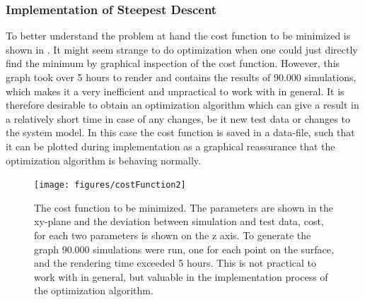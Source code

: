 \subsubsection{Implementation of Steepest Descent}
To better understand the problem at hand the cost function to be minimized is shown in . It might seem strange to do optimization when one could just directly find the minimum by graphical inspection of the cost function. However, this graph took over 5 hours to render and contains the results of 90.000 simulations, which makes it a very inefficient and unpractical to work with in general. It is therefore desirable to obtain an optimization algorithm which can give a result in a relatively short time in case of any changes, be it new test data or changes to the system model. In this case the cost function is saved in a data-file, such that it can be plotted during implementation as a graphical reassurance that the optimization algorithm is behaving normally.

\begin{figure}[H]
	\centering
	\texttt{[image: figures/costFunction2]}
	\caption{The cost function to be minimized. The parameters are shown in the xy-plane and the deviation between simulation and test data, cost, for each two parameters is shown on the z axis. To generate the graph 90.000 simulations were run, one for each point on the surface, and the rendering time exceeded 5 hours. This is not practical to work with in general, but valuable in the implementation process of the optimization algorithm.}
	\label{costFunction}
\end{figure}

